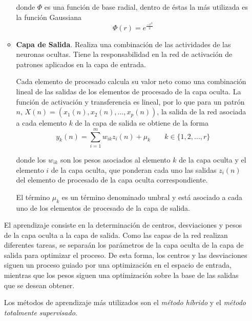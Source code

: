 \documentclass[letterpaper,11pt]{article}
\begin{document}
\begin{enumerate}
\begin{itemize}
        donde $\Phi$ es una función de base radial, dentro de éstas la más 
        utilizada es la función Gaussiana 
        \begin{equation*}
            \Phi (r) = e^{\frac{-r^2}{2}}
        \end{equation*}

        \item \textbf{Capa de Salida}. Realiza una combinación de las actividades 
        de las neuronas ocultas. Tiene la responsabilidad en la red de activación 
        de patrones aplicados en la capa de entrada. 

        Cada elemento de procesado calcula su valor neto como una combinación
        lineal de las salidas de los elementos de procesado de la capa oculta.
        La función de activación y transferencia es lineal, por lo que para un 
        patrón $n$, $X(n) = (x_1 (n), x_2 (n), ..., x_p (n))$, la salida de la 
        red asociada a cada elemento $k$ de la capa de salida se obtiene de la 
        forma 
        \begin{equation*}
            y_k (n) = \sum^m_{i=1} w_{ik} z_i (n) + \mu_k \; \; \; \; \; \; \;
            k \in \{1, 2, ..., r\}
        \end{equation*}

        donde los $w_{ik}$ son los pesos asociados al elemento $k$ de la capa 
        oculta y el elemento $i$ de la capa oculta, que ponderan cada uno las 
        salidas $z_i (n)$ del elemento de procesado de la capa oculta 
        correspondiente. 

        El término $\mu_k$ es un término denominado umbral y está asociado a
        cada uno de los elementos de procesado de la capa de salida. 
    \end{itemize}

    El aprendizaje consiste en la determinación de centros, desviaciones y pesos 
    de la capa oculta a la capa de salida. Como las capas de la red realizan 
    diferentes tareas, se separaán los parámetros de la capa oculta de la capa 
    de salida para optimizar el proceso. De esta forma, los centros y las 
    desviaciones siguen un proceso guiado por una optimización en el espacio de 
    entrada, mientras que los pesos siguen una optimización sobre la base de las 
    salidas que se desean obtener. 

    Los métodos de aprendizaje más utilizados son el \textit{método híbrido} y
    el \textit{método totalmente supervisado}. 
\end{enumerate}
\end{document}
